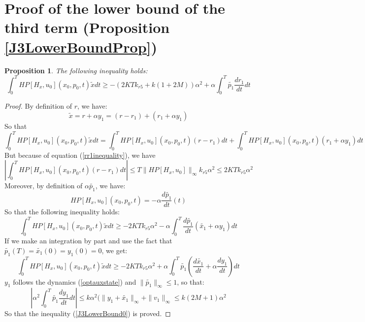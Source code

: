 \documentclass[a4paper,10pt]{article}
\newtheorem{proposition}{Proposition}
\begin{document}
\section{Proof of the lower bound of the third term (Proposition 
\ref{J3LowerBoundProp})}\label{J3LowerBoundProof}
\begin{proposition}
    The following inequality holds:
\begin{equation}
            \int_{0}^{T} HP[H_{x},u_{0}](x_{0},p_{0},t) \tilde{x} dt   
            \geq -(2KTk_{r5}+k(1+2M))\alpha^{2}  +   
        \alpha \int_{0}^{T} \tilde{p_{1}} \frac{dr_{1}}{dt} dt
            \label{J3LowerBound0}
\end{equation}
\end{proposition}
\begin{proof}
    By definition of $r$, we have:
    \[
        \tilde{x} = r + \alpha y_{1} = (r-r_{1}) + (r_{1} + \alpha y_{1})
    \]
    So that
    \[
        \int_{0}^{T} HP[H_{x},u_{0}](x_{0},p_{0},t) \tilde{x} dt
	= \int_{0}^{T} HP[H_{x},u_{0}](x_{0},p_{0},t) (r-r_{1}) dt
	+ \int_{0}^{T} HP[H_{x},u_{0}](x_{0},p_{0},t) (r_{1} + \alpha y_{1}) dt
    \]
    But because of equation (\ref{rr1inequality}), we have
    \[
       \left|\int_{0}^{T} HP[H_{x},u_{0}](x_{0},p_{0},t) (r-r_{1}) dt\right|
       \leq T\|HP[H_{x},u_{0}]\|_{\infty}k_{r5}\alpha^{2} \leq 
       2KTk_{r5}\alpha^{2}
    \]
    Moreover, by definition of $\alpha \tilde{p_{1}}$, we have:
    \[
       HP[H_{x},u_{0}](x_{0},p_{0},t) = -\alpha \frac{d\tilde{p_{1}}}{dt}(t) 
    \]
    So that the following inequality holds:
    \[
        \int_{0}^{T} HP[H_{x},u_{0}](x_{0},p_{0},t) \tilde{x} dt
	\geq -2KTk_{r5}\alpha^{2} - \alpha \int_{0}^{T}  
	\frac{d\tilde{p_{1}}}{dt}(\tilde{x_{1}}+ \alpha y_{1}) dt
    \]
    If we make an integration by part and use the fact that 
    $\tilde{p_{1}}(T)=\tilde{x_{1}}(0)=y_{1}(0)=0$, we get:
    \[
        \int_{0}^{T} HP[H_{x},u_{0}](x_{0},p_{0},t) \tilde{x} dt
	\geq -2KTk_{r5}\alpha^{2} +
	\alpha \int_{0}^{T}  
	\tilde{p_{1}}\left(\frac{d\tilde{x_{1}}}{dt} + \alpha\frac{dy_{1}}{dt}\right) dt
    \]
    $y_{1}$ follows the dynamics (\ref{optauxstate}) and 
    $\|\tilde{p_{1}}\|_{\infty} \leq 1$, so that:
    \[
        \left|\alpha^{2} \int_{0}^{T}  \tilde{p_{1}}\frac{dy_{1}}{dt} dt\right|
        \leq  k\alpha^{2} (\|y_{1}+\tilde{x_{1}}\|_{\infty}  +\|v_{1}\|_{\infty}
	\leq k(2M+1) \alpha^{2}
    \]
    So that the inequality (\ref{J3LowerBound0}) is proved.
\end{proof}
\end{document}
